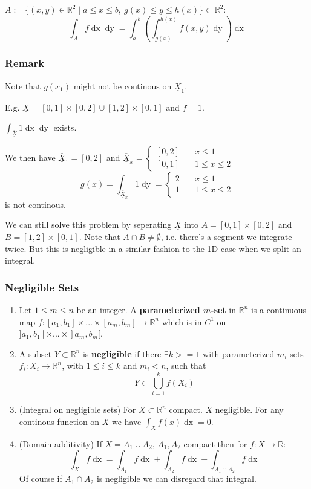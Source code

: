 \documentclass[a4paper,fontsize = 10pt]{article}
\def\R{\mathbb{R}}
\def\X{\underline{\overline{X}}}
\begin{document}
$A := \{(x,y)\in \R^2 \mid a \leq x \leq b, \ g(x) \leq y \leq h(x)\} \subset \R^2$:
\[\int_A f \mathop{dx}\mathop{dy} = \int_{a}^{b} \left(\int_{g(x)}^{h(x)}f(x,y) \mathop{dy}\right)\mathop{dx}\]

\subsubsection*{Remark}
Note that $g(x_1)$ might not be continous on $\X_1$. 

E.g. $\X = [0, 1] \times [0, 2] \cup [1, 2] \times [0, 1]$ and $f = 1$.

\(\int_{\X}1\mathop{dx}\mathop{dy}\) exists. 

We then have $\X_1 = [0,2]$ and $ \X_{x} = 
\begin{cases}
   [0,2] \quad& x \leq 1\\
   [0,1] \quad& 1 \leq x \leq 2
\end{cases}
$
\[
     g(x)= \int_{\X_x}1 \mathop{dy} = 
    \begin{cases}
        2 \quad& x \leq 1\\
        1 \quad& 1 \leq x \leq 2
    \end{cases}
\]
is not continous.

We can still solve this problem by seperating $\X$ into $A = [0, 1] \times [0,2]$ and $B = [1,2] \times [0,1]$. Note that $A \cap B \neq \emptyset$, i.e. there's a segment we integrate twice. But this is negligible in a similar fashion to the 1D case when we split an integral.

\subsubsection{Negligible Sets}
\begin{enumerate}
    \item Let $1 \leq m \leq n$ be an integer. A \textbf{parameterized $m$-set} in $\R^n$ is a continuous map $f: [a_1,b_1] \times ... \times [a_m,b_m] \to \R^n$ which is in $C^1$ on $]a_1,b_1[ \times ... \times ]a_m, b_m[.$
    \item A subset $Y \subset \R^n$ is \textbf{negligible} if there $\exists k >= 1$ with parameterized $m_i$-sets $f_i: X_i \to \R^n$, with $1 \leq i \leq k$ and $m_i < n$, such that \[Y \subset \bigcup_{i = 1}^{k}f(X_i)\] 
    \item (Integral on negligible sets) For $X \subset \R^n$ compact. $X$ negligible. For any continous function on $X$ we have $\int_{X}f(x)\mathop{dx} = 0$.
    \item (Domain additivity) If $X = A_1 \cup A_2$, $A_1, A_2$ compact then for $f: X \to \R$: 
    \[\int_X f\mathop{dx} = \int_{A_1}f\mathop{dx} + \int_{A_2}f\mathop{dx} -\int_{A_1 \cap A_2}f\mathop{dx}\]
    Of course if $A_1 \cap A_2$ is negligible we can disregard that integral.
\end{enumerate}
\end{document}
